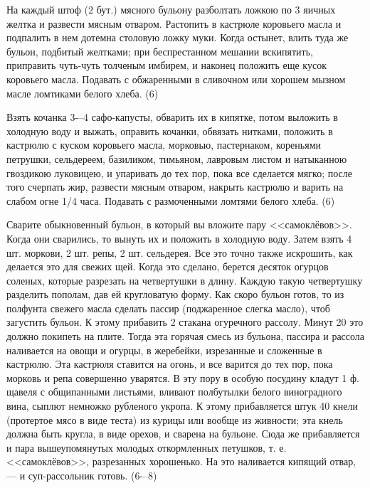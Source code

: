 На каждый штоф (2 бут.) мясного бульону разболтать ложкою по 3 яичных желтка и развести мясным отваром. Растопить в кастрюле коровьего масла и подпалить в нем дотемна столовую ложку муки. Когда остынет, влить туда же бульон, подбитый желтками; при беспрестанном мешании вскипятить, приправить чуть-чуть толченым имбирем, и наконец положить еще кусок коровьего масла. Подавать с обжаренными в сливочном или хорошем мызном масле ломтиками белого хлеба. (6)


Взять кочанка 3-–4 сафо-капусты, обварить их в кипятке, потом выложить в холодную воду и выжать, оправить кочанки, обвязать нитками, положить в кастрюлю с куском коровьего масла, морковью, пастернаком, кореньями петрушки, сельдереем, базиликом, тимьяном, лавровым листом и натыканною гвоздикою луковицею, и упаривать до тех пор, пока все сделается мягко; после того счерпать жир, развести мясным отваром, накрыть кастрюлю и варить на слабом огне 1/4 часа. Подавать с размоченными ломтями белого хлеба. (6)


Сварите обыкновенный бульон, в который вы вложите пару <<самоклёвов>>. Когда они сварились, то вынуть их и положить в холодную воду. Затем взять 4 шт. моркови, 2 шт. репы, 2 шт. сельдерея. Все это точно также искрошить, как делается это для свежих щей. Когда это сделано, берется десяток огурцов соленых, которые разрезать на четвертушки в длину. Каждую такую четвертушку разделить пополам, дав ей кругловатую форму. Как скоро бульон готов, то из полфунта свежего масла сделать пассир (поджаренное слегка масло), чтоб загустить бульон. К этому прибавить 2 стакана огуречного рассолу. Минут 20 это должно покипеть на плите. Тогда эта горячая смесь из бульона, пассира и рассола наливается на овощи и огурцы, в жеребейки, изрезанные и сложенные в кастрюлю. Эта кастрюля ставится на огонь, и все варится до тех пор, пока морковь и репа совершенно уварятся. В эту пору в особую посудину кладут 1 ф. щавеля с общипанными листьями, вливают полбутылки белого виноградного вина, сыплют немножко рубленого укропа. К этому прибавляется штук 40 кнели (протертое мясо в виде теста) из курицы или вообще из живности; эта кнель должна быть кругла, в виде орехов, и сварена на бульоне. Сюда же прибавляется и пара вышеупомянутых молодых откормленных петушков, т. е. <<самоклёвов>>, разрезанных хорошенько. На это наливается кипящий отвар, — и суп-рассольник готовь. (6-–8)

